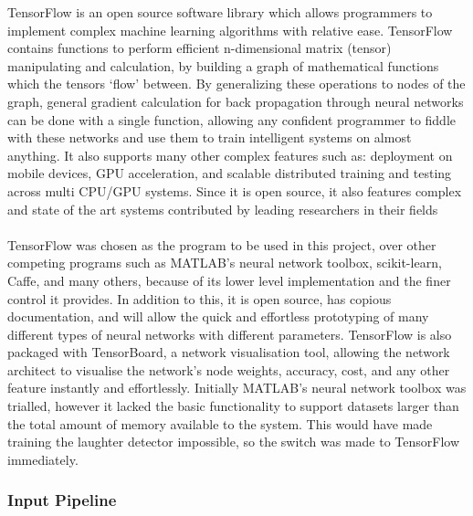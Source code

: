 \documentclass[a4paper,11pt,notitlepage]{article}
\begin{document}
TensorFlow is an open source software library which allows programmers to implement complex machine learning algorithms with relative ease. TensorFlow contains functions to perform efficient n-dimensional matrix (tensor) manipulating and calculation, by building a graph of mathematical functions which the tensors `flow' between. By generalizing these operations to nodes of the graph, general gradient calculation for back propagation through neural networks can be done with a single function, allowing any confident programmer to fiddle with these networks and use them to train intelligent systems on almost anything. It also supports many other complex features such as: deployment on mobile devices, GPU acceleration, and scalable distributed training and testing across multi CPU/GPU systems. Since it is open source, it also features complex and state of the art systems contributed by leading researchers in their fields\\
\\
TensorFlow was chosen as the program to be used in this project, over other competing programs such as MATLAB's neural network toolbox, scikit-learn, Caffe, and many others, because of its lower level implementation and the finer control it provides. In addition to this, it is open source, has copious documentation, and will allow the quick and effortless prototyping of many different types of neural networks with different parameters. TensorFlow is also packaged with TensorBoard, a network visualisation tool, allowing the network architect to visualise the network's node weights, accuracy, cost, and any other feature instantly and effortlessly. Initially MATLAB's neural network toolbox was trialled, however it lacked the basic functionality to support datasets larger than the total amount of memory available to the system. This would have made training the laughter detector impossible, so the switch was made to TensorFlow immediately.

\subsubsection{Input Pipeline}\label{section:input_pipeline}

\end{document}
